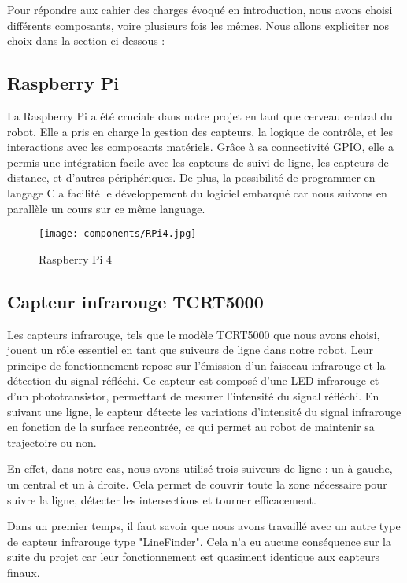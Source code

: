 Pour répondre aux cahier des charges évoqué en introduction, nous avons choisi différents composants, voire plusieurs fois les mêmes. Nous allons expliciter nos choix dans la section ci-dessous :

\subsection{Raspberry Pi}
La Raspberry Pi a été cruciale dans notre projet en tant que cerveau central du robot. Elle a pris en charge la gestion des capteurs, la logique de contrôle, et les interactions avec les composants matériels. Grâce à sa connectivité GPIO, elle a permis une intégration facile avec les capteurs de suivi de ligne, les capteurs de distance, et d'autres périphériques. De plus, la possibilité de programmer en langage C a facilité le développement du logiciel embarqué car nous suivons en parallèle un cours sur ce même language.

\begin{figure}[h]
    \centering
    \texttt{[image: components/RPi4.jpg]}
    \caption{Raspberry Pi 4}
    \label{fig:Raspberry Pi 4}
\end{figure}

\subsection{Capteur infrarouge TCRT5000}
Les capteurs infrarouge, tels que le modèle TCRT5000 que nous avons choisi, jouent un rôle essentiel en tant que suiveurs de ligne dans notre robot. Leur principe de fonctionnement repose sur l'émission d'un faisceau infrarouge et la détection du signal réfléchi. Ce capteur est composé d'une LED infrarouge et d'un phototransistor, permettant de mesurer l'intensité du signal réfléchi. En suivant une ligne, le capteur détecte les variations d'intensité du signal infrarouge en fonction de la surface rencontrée, ce qui permet au robot de maintenir sa trajectoire ou non.

En effet, dans notre cas, nous avons utilisé trois suiveurs de ligne : un à gauche, un central et un à droite. Cela permet de couvrir toute la zone nécessaire pour suivre la ligne, détecter les intersections et tourner efficacement.

Dans un premier temps, il faut savoir que nous avons travaillé avec un autre type de capteur infrarouge type "LineFinder". Cela n'a eu aucune conséquence sur la suite du projet car leur fonctionnement est quasiment identique aux capteurs finaux.

